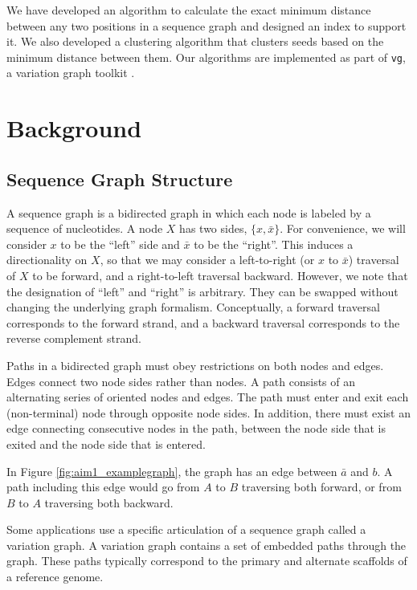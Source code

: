 \documentclass[11pt]{ucscthesis}
\begin{document}
We have developed an algorithm to calculate the exact minimum distance between any two positions in a sequence graph and designed an index to support it. We also developed a clustering algorithm that clusters seeds based on the minimum distance between them. Our algorithms are implemented as part of \texttt{vg}, a variation graph toolkit \cite{garrison_vg_2018}.

\section{Background}

\subsection{Sequence Graph Structure}


A sequence graph is a bidirected graph in which each node is labeled by a sequence of nucleotides.
A node $X$ has two sides, $\{x, \bar{x}\}$. For convenience, we will consider $x$  to be the ``left'' side and $\bar x$ to be the ``right''.
This induces a directionality on $X$, so that we may consider a left-to-right (or $x$ to $\bar{x}$) traversal of $X$ to be forward, and a right-to-left traversal backward.
However, we note that the designation of ``left'' and ``right'' is arbitrary.
They can be swapped without changing the underlying graph formalism.
Conceptually, a forward traversal corresponds to the forward strand, and a backward traversal corresponds to the reverse complement strand.

Paths in a bidirected graph must obey restrictions on both nodes and edges.
Edges connect two node sides rather than nodes.
A path consists of an alternating series of oriented nodes and edges.
The path must enter and exit each (non-terminal) node through opposite node sides.
In addition, there must exist an edge connecting consecutive nodes in the path, between the node side that is exited and the node side that is entered.

In Figure \ref{fig:aim1_examplegraph}, the graph has an edge between $\bar{a}$ and $b$.
A path including this edge would go from $A$ to $B$ traversing both forward, or from $B$ to $A$ traversing both backward.
    
Some applications use a specific articulation of a sequence graph called a variation graph.
A variation graph contains a set of embedded paths through the graph.
These paths typically correspond to the primary and alternate scaffolds of a reference genome.
\end{document}
